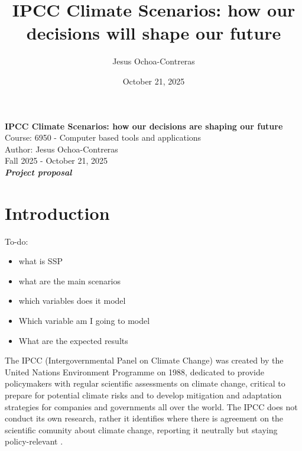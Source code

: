 \documentclass[letterpaper, 12pt]{article}
\author{Jesus Ochoa-Contreras}
\date{October 21, 2025}
\title{IPCC Climate Scenarios: how our decisions will shape our future}
\begin{document}
\setlength{\parskip}{10pt}
\setlength{\parindent}{30pt}


\begin{center}
	
	\LARGE{\textbf{IPCC Climate Scenarios: how our decisions are shaping our future}} \\
	\vspace{0.5cm}
	\Large{Course: 6950 - Computer based tools and applications} \\
	\vspace{0.25cm}
	\large{Author: Jesus Ochoa-Contreras} \\
	\vspace{0.25cm}
	\large{Fall 2025 - October 21, 2025} \\
	
	\vspace{1cm}
	\large{\textbf{\textit{Project proposal}}}
\end{center}


\section{Introduction}

To-do:

\begin{itemize}
	\item what is SSP
	\item what are the main scenarios
	\item which variables does it model
	\item Which variable am I going to model
	\item What are the expected results
\end{itemize}

The IPCC (Intergovernmental Panel on Climate Change) was created by the United Nations Environment Programme on 1988, dedicated to provide policymakers with regular scientific assessments on climate change, critical to prepare for potential climate risks and to develop mitigation and adaptation strategies for companies and governments all over the world. The IPCC does not conduct its own research, rather it identifies where there is agreement on the scientific comunity about climate change, reporting it neutrally but staying policy-relevant \parencite{ipcc}.
\end{document}
